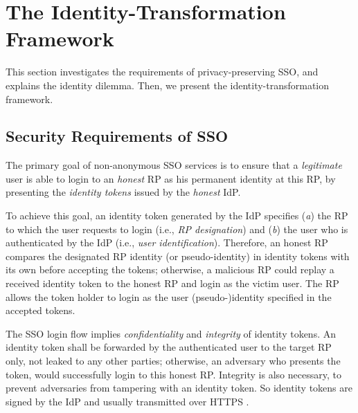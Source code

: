 \section{The Identity-Transformation Framework}
\label{sec:challenge}

This section investigates the requirements of privacy-preserving SSO,
    and explains the identity dilemma.
Then,
    we present the identity-transformation framework.


\subsection{Security Requirements of SSO}
\label{subsec:basicrequirements}

The primary goal of non-anonymous SSO services is %
 to ensure that a \emph{legitimate} user is able to login to an \emph{honest} RP as his permanent identity at this RP, %
    by presenting the \emph{identity tokens} issued by the \emph{honest} IdP.

To achieve this goal,
 an identity token generated by the IdP  specifies (\emph{a}) the RP to which the user requests to login (i.e., \emph{RP designation})
    and  (\emph{b}) the user who is authenticated by the IdP (i.e., \emph{user identification}).
Therefore,
    an honest RP compares the designated RP identity (or pseudo-identity) in identity tokens with its own before accepting the tokens;
     otherwise,
        a malicious RP could replay a received identity token to the honest RP and login as the victim user.
The RP allows the token holder to login as the user (pseudo-)identity specified in the accepted tokens.

The SSO login flow implies \emph{confidentiality} and \emph{integrity} of identity tokens.
An identity token shall be forwarded by the authenticated user to the target RP only,
    not leaked to any other parties;
        otherwise, an adversary who presents the token, would successfully login to this honest RP.
Integrity is also necessary,
    to prevent adversaries from tampering with an identity token.
So identity tokens are signed by the IdP and usually transmitted over HTTPS \cite{OpenIDConnect,rfc6749,SAML}.

